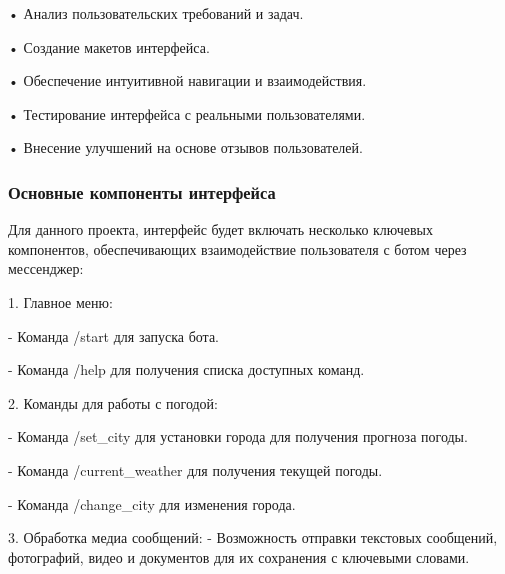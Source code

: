 •	Анализ пользовательских требований и задач.

•	Создание макетов интерфейса.

•	Обеспечение интуитивной навигации и взаимодействия.

•	Тестирование интерфейса с реальными пользователями.

•	Внесение улучшений на основе отзывов пользователей.
\subsubsection{Основные компоненты интерфейса}
Для данного проекта, интерфейс будет включать несколько ключевых компонентов, обеспечивающих взаимодействие пользователя с ботом через мессенджер:

1.	Главное меню:

	-	Команда /start для запуска бота.
	
	-	Команда /help для получения списка доступных команд.
	
2.	Команды для работы с погодой:

	-	Команда /set\_city для установки города для получения прогноза погоды.
	
	-	Команда /current\_weather для получения текущей погоды.
	
	-	Команда /change\_city для изменения города.
	
3.	Обработка медиа сообщений:
	-	Возможность отправки текстовых сообщений, фотографий, видео и документов для их сохранения с ключевыми словами.


